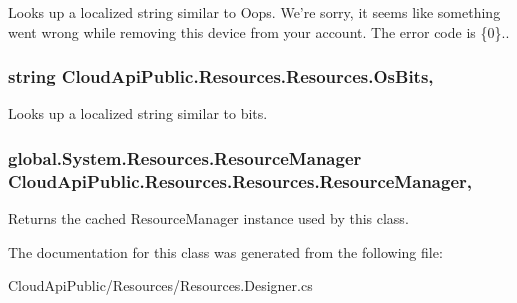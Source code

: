 Looks up a localized string similar to Oops. We're sorry, it seems like something went wrong while removing this device from your account. The error code is \{0\}.. 

\hypertarget{class_cloud_api_public_1_1_resources_1_1_resources_a998c59aa83300bbd83ad7f6c6c4e9b0b}{
\subsubsection[{Os\-Bits}]{\setlength{\rightskip}{0pt plus 5cm}string Cloud\-Api\-Public.\-Resources.\-Resources.\-Os\-Bits\hspace{0.3cm}{\ttfamily [static]}, {\ttfamily [get]}}}\label{class_cloud_api_public_1_1_resources_1_1_resources_a998c59aa83300bbd83ad7f6c6c4e9b0b}


Looks up a localized string similar to bits. 

\hypertarget{class_cloud_api_public_1_1_resources_1_1_resources_a8d7a2d1cd9997e51ab712cb4a16bcb5d}{
\subsubsection[{Resource\-Manager}]{\setlength{\rightskip}{0pt plus 5cm}global.\-System.\-Resources.\-Resource\-Manager Cloud\-Api\-Public.\-Resources.\-Resources.\-Resource\-Manager\hspace{0.3cm}{\ttfamily [static]}, {\ttfamily [get]}}}\label{class_cloud_api_public_1_1_resources_1_1_resources_a8d7a2d1cd9997e51ab712cb4a16bcb5d}


Returns the cached Resource\-Manager instance used by this class. 



The documentation for this class was generated from the following file\-:\begin{DoxyCompactItemize}
\item 
Cloud\-Api\-Public/\-Resources/Resources.\-Designer.\-cs\end{DoxyCompactItemize}
